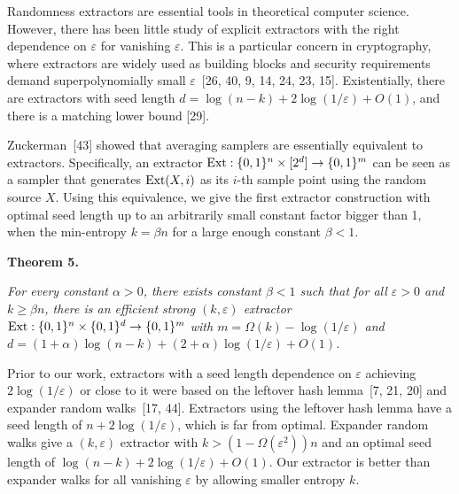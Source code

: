 


Randomness extractors are essential tools in theoretical computer science. However, there has been little study of explicit extractors with the right dependence on $\varepsilon$ for vanishing $\varepsilon$.
This is a particular concern in cryptography, where extractors are widely used as building blocks and security requirements demand superpolynomially small $\varepsilon$ [26, 40, 9, 14, 24, 23, 15].
Existentially, there are extractors with seed length $d=\log(n-k)+2\log(1/\varepsilon)+O(1)$, and there is a matching lower bound [29].\par




Zuckerman [43] showed that averaging samplers are essentially equivalent to extractors. Specifically, an extractor $\textup{{Ext}}:\{0,1\}^{n}\times[2^{d}]\to\{0,1\}^{m}$ can be seen as a sampler that generates $\textup{{Ext}}(X,i)$ as its $i$-th sample point using the random source $X$. Using this equivalence, we give the first extractor construction with optimal seed length up to an arbitrarily small constant factor bigger than 1, when the min-entropy $k=\beta n$ for a large enough constant $\beta<1$.\par





\par\medskip\noindent\textbf{
\textbf{Theorem 5}\textbf{.}
}\par



\emph{For every constant $\alpha>0$, there exists constant $\beta<1$ such that for all $\varepsilon>0$ and $k\geq\beta n$, there is an efficient strong $(k,\varepsilon)$ extractor $\textup{{Ext}}:\{0,1\}^{n}\times\{0,1\}^{d}\to\{0,1\}^{m}$ with $m=\Omega(k)-\log(1/\varepsilon)$ and $d=(1+\alpha)\log(n-k)+(2+\alpha)\log(1/\varepsilon)+O(1)$.}\par






Prior to our work, extractors with a seed length dependence on $\varepsilon$ achieving $2\log(1/\varepsilon)$ or close to it were based on the leftover hash lemma [7, 21, 20] and expander random walks [17, 44]. Extractors using the leftover hash lemma have a seed length of $n+2\log(1/\varepsilon)$, which is far from optimal. Expander random walks give a $(k,\varepsilon)$ extractor with $k>(1-\Omega(\varepsilon^{2}))n$ and an optimal seed length of $\log(n-k)+2\log(1/\varepsilon)+O(1)$. Our extractor is better than expander walks for all vanishing $\varepsilon$ by allowing smaller entropy $k$.\par




